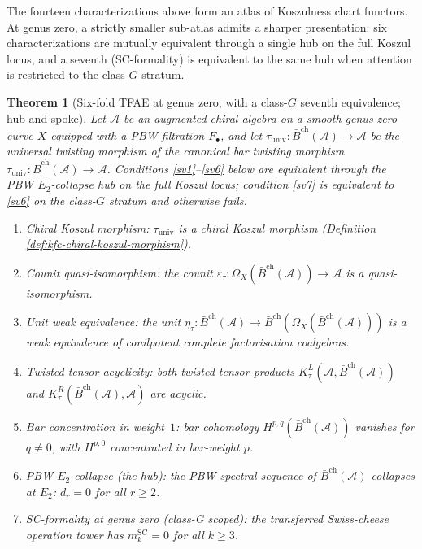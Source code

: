 \documentclass[11pt,reqno]{amsart}
\newtheorem{theorem}{Theorem}[section]
\theoremstyle{definition}
\theoremstyle{remark}
\newcommand{\cA}{\mathcal{A}}
\newcommand{\barBch}{\bar{B}^{\mathrm{ch}}}
\newcommand{\Etwo}{E_2}
\numberwithin{equation}{section}
\begin{document}
The fourteen characterizations above form an atlas of
Koszulness chart functors. At genus zero, a strictly smaller
sub-atlas admits a sharper presentation: six characterizations
are mutually equivalent through a single hub on the full Koszul
locus, and a seventh (SC-formality) is equivalent to the same hub
when attention is restricted to the class-$G$ stratum.

\begin{theorem}[Six-fold TFAE at genus zero, with a class-$G$
seventh equivalence; hub-and-spoke]\label{thm:seven-fold-tfae-hub-spoke-sa}
Let $\cA$ be an augmented chiral algebra on a smooth genus-zero
curve $X$ equipped with a PBW filtration $F_\bullet$, and let
$\tau_{\mathrm{univ}}\colon \barBch(\cA) \to \cA$ be the
universal twisting morphism of
the canonical bar twisting morphism
$\tau_{\mathrm{univ}}\colon\barBch(\cA)\to\cA$. Conditions
\textup{\ref{sv1}--\ref{sv6}} below are equivalent \emph{through
the PBW $\Etwo$-collapse hub} on the full Koszul locus;
condition \textup{\ref{sv7}} is equivalent to \textup{\ref{sv6}}
on the class-$G$ stratum and otherwise fails.
\begin{enumerate}[label=\textup{(S\arabic*)},leftmargin=3em]
\item\label{sv1}
  \emph{Chiral Koszul morphism}: $\tau_{\mathrm{univ}}$ is a
  chiral Koszul morphism (Definition
  \textup{\ref{def:kfc-chiral-koszul-morphism}}).
\item\label{sv2}
  \emph{Counit quasi-isomorphism}: the counit
  $\varepsilon_{\tau}\colon
   \Omega_X(\barBch(\cA)) \to \cA$ is a quasi-isomorphism.
\item\label{sv3}
  \emph{Unit weak equivalence}: the unit
  $\eta_\tau\colon \barBch(\cA) \to
   \barBch(\Omega_X(\barBch(\cA)))$ is a weak equivalence of
  conilpotent complete factorisation coalgebras.
\item\label{sv4}
  \emph{Twisted tensor acyclicity}: both twisted tensor
  products $K_\tau^L(\cA, \barBch(\cA))$ and
  $K_\tau^R(\barBch(\cA), \cA)$ are acyclic.
\item\label{sv5}
  \emph{Bar concentration in weight~$1$}: bar cohomology
  $H^{p,q}(\barBch(\cA))$ vanishes for $q \neq 0$, with
  $H^{p,0}$ concentrated in bar-weight $p$.
\item\label{sv6}
  \emph{PBW $\Etwo$-collapse} \textup{(the hub)}: the PBW
  spectral sequence of $\barBch(\cA)$ collapses at $E_2$:
  $d_r = 0$ for all $r \geq 2$.
\item\label{sv7}
  \emph{\textup{SC}-formality at genus zero}
  \textup{(class-G scoped)}: the transferred Swiss-cheese
  operation tower has $m_k^{\mathrm{SC}} = 0$ for all
  $k \geq 3$.
\end{enumerate}


\end{theorem}
\end{document}
